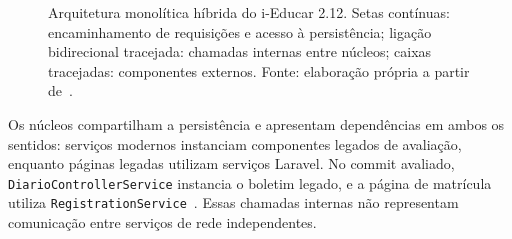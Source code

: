 \documentclass[conference]{model/IEEEtran}%
\begin{document}
\begin{figure}[!t]
{}
\caption{Arquitetura monolítica híbrida do i-Educar 2.12. Setas contínuas: encaminhamento de requisições e acesso à persistência; ligação bidirecional tracejada: chamadas internas entre núcleos; caixas tracejadas: componentes externos. Fonte: elaboração própria a partir de~\cite{ieducar_repo}.}
\label{fig:arquitetura}
\end{figure}

Os núcleos compartilham a persistência e apresentam dependências em ambos os sentidos: serviços modernos instanciam componentes legados de avaliação, enquanto páginas legadas utilizam serviços Laravel. No commit avaliado, \texttt{DiarioControllerService} instancia o boletim legado, e a página de matrícula utiliza \texttt{RegistrationService}~\cite{ieducar_repo}. Essas chamadas internas não representam comunicação entre serviços de rede independentes.
\end{document}
